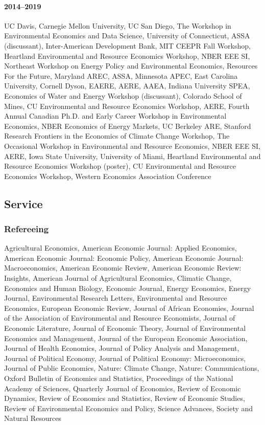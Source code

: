 \documentclass[11pt]{res} %
\begin{document}
\begin{resume}
\paragraph{2014--2019} UC Davis, Carnegie Mellon University, UC San Diego, The Workshop in Environmental Economics and Data Science, University of Connecticut, ASSA (discussant), Inter-American Development Bank, MIT CEEPR Fall Workshop, Heartland Environmental and Resource Economics Workshop, NBER EEE SI, Northeast Workshop on Energy Policy and Environmental Economics, Resources For the Future, Maryland AREC, ASSA, Minnesota APEC, East Carolina University, Cornell Dyson, EAERE, AERE, AAEA, Indiana University SPEA, Economics of Water and Energy Workshop (discussant), Colorado School of Mines, CU Environmental and Resource Economics Workshop, AERE, Fourth Annual Canadian Ph.D. and Early Career Workshop in Environmental Economics, NBER Economics of Energy Markets, UC Berkeley ARE, Stanford Research Frontiers in the Economics of Climate Change Workshop, The Occasional Workshop in Environmental and Resource Economics, NBER EEE SI, AERE, Iowa State University, University of Miami, Heartland Environmental and Resource Economics Workshop (poster), CU Environmental and Resource Economics Workshop, Western Economics Association Conference

\vspace{-.2in}

\subsection{Service}\vspace{-.2in}
\subsubsection{Refereeing}\vspace{-.2in}
	Agricultural Economics,
	American Economic Journal: Applied Economics,
	American Economic Journal: Economic Policy,
	American Economic Journal: Macroeconomics,
	American Economic Review,
	American Economic Review: Insights,
	American Journal of Agricultural Economics,
	Climatic Change,
	Economics and Human Biology,
	Economic Journal,
	Energy Economics,
	Energy Journal,
	Environmental Research Letters,
	Environmental and Resource Economics,
	European Economic Review,
	Journal of African Economies,
	Journal of the Association of Environmental and Resource Economists,
	Journal of Economic Literature,
	Journal of Economic Theory,
	Journal of Environmental Economics and Management,
	Journal of the European Economic Association,
	Journal of Health Economics,
	Journal of Policy Analysis and Management,
	Journal of Political Economy,
	Journal of Political Economy: Microeconomics,
	Journal of Public Economics,
	Nature: Climate Change,
	Nature: Communications,
	Oxford Bulletin of Economics and Statistics,
	Proceedings of the National Academy of Sciences,
	Quarterly Journal of Economics,
	Review of Economic Dynamics,
	Review of Economics and Statistics,
	Review of Economic Studies,
	Review of Environmental Economics and Policy,
	Science Advances,
	Society and Natural Resources


\end{resume}
\end{document}
